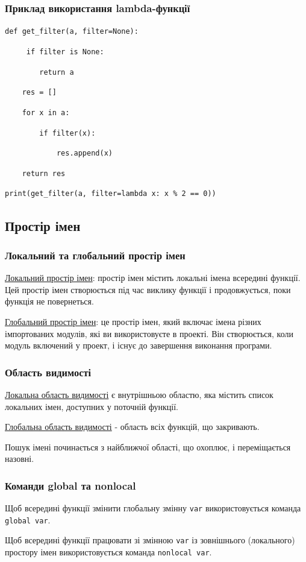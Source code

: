 \begin{frame}
\frametitle{Приклад використання lambda-функції}

\texttt{def get\_filter(a, filter=None):}

\texttt{~~~~ if filter is None:}

\texttt{~~~~~~~~return a}

\texttt{~~~~res = []}

\texttt{~~~~for x in a:}

\texttt{~~~~~~~~if filter(x):}

\texttt{~~~~~~~~~~~~res.append(x)}

\texttt{~~~~return res}

\texttt{print(get\_filter(a, filter=lambda x: x \% 2 == 0))}
\end{frame}

\subsection{Простір імен} 
\begin{frame}
\frametitle{Локальний та глобальний простір імен}
\underline{Локальний простір імен}: простір імен містить локальні імена всередині функції. Цей простір імен створюється під час виклику функції і продовжується, поки функція не повернеться.

\underline{Глобальний простір імен}: це простір імен, який включає імена різних імпортованих модулів, які ви використовуєте в проекті. Він створюється, коли модуль включений у проект, і існує до завершення виконання програми.

\end{frame}

\begin{frame}
\frametitle{Область видимості}
\underline{Локальна область видимості} є внутрішньою областю, яка містить список локальних імен, доступних у поточній функції.

\underline{Глобальна область  видимості} - область всіх функцій, що закривають. 

Пошук імені починається з найближчої області, що охоплює, і переміщається назовні.


\end{frame}

\begin{frame}
\frametitle{Команди global та nonlocal}

Щоб всередині функції змінити глобальну змінну \texttt{var} використовується команда \texttt{global var}.

Щоб всередині функції працювати зі змінною \texttt{var} із зовнішнього (локального) простору імен використовується команда \texttt{nonlocal var}.

\end{frame}

